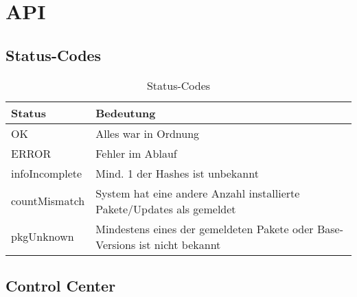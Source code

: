 \begin{comment}

Source: https://redmine.upd89.org/redmine/projects/upd89/wiki/API

\end{comment}

\chapter{API}


\section*{Status-Codes}

\begin{table}[H]
    \centering
    \caption{Status-Codes}
    \label{api:codes}
    \begin{tabular}{ll}
        \hline
        \textbf{Status} & \textbf{Bedeutung}                                                          \\ \hline
        OK              & Alles war in Ordnung                                                        \\
        ERROR           & Fehler im Ablauf                                                            \\
        infoIncomplete  & Mind. 1 der Hashes ist unbekannt                                            \\
        countMismatch   & System hat eine andere Anzahl installierte Pakete/Updates als gemeldet      \\
        pkgUnknown      & Mindestens eines der gemeldeten Pakete oder Base-Versions ist nicht bekannt \\ \hline
    \end{tabular}
\end{table}


\section*{Control Center}

